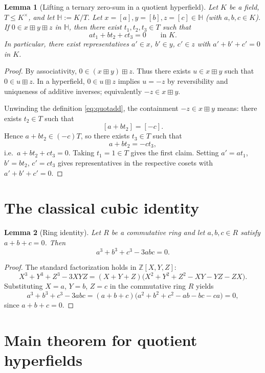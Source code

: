 \documentclass[11pt]{article}
\newtheorem{lemma}{Lemma}
\newcommand{\Hf}{\mathbb{H}}
\newcommand{\boxplusop}{\boxplus}
\begin{document}
\begin{lemma}[Lifting a ternary zero-sum in a quotient hyperfield]\label{lem:lift}
Let $K$ be a field, $T\le K^\times$, and let $\Hf:=K/T$.
Let $x=[a],y=[b],z=[c]\in \Hf$ (with $a,b,c\in K$).
If $0\in x\boxplusop y\boxplusop z$ in $\Hf$, then there exist $t_1,t_2,t_3\in T$ such that
\[
a t_1 + b t_2 + c t_3 = 0
\qquad\text{in }K.
\]
In particular, there exist representatives $a'\in x$, $b'\in y$, $c'\in z$ with $a'+b'+c'=0$ in $K$.
\end{lemma}

\begin{proof}
By associativity, $0\in (x\boxplusop y)\boxplusop z$.
Thus there exists $u\in x\boxplusop y$ such that $0\in u\boxplusop z$.
In a hyperfield, $0\in u\boxplusop z$ implies $u=-z$ by reversibility and uniqueness of additive inverses;
equivalently $-z\in x\boxplusop y$.

Unwinding the definition \eqref{eq:quotadd}, the containment $-z\in x\boxplusop y$ means:
there exists $t_2\in T$ such that
\[
[a+b t_2]=[-c].
\]
Hence $a+b t_2\in (-c)T$, so there exists $t_3\in T$ such that
\[
a + b t_2 = -c t_3,
\]
i.e.\ $a + b t_2 + c t_3=0$.
Taking $t_1=1\in T$ gives the first claim. Setting $a'=a t_1$, $b'=b t_2$, $c'=c t_3$
gives representatives in the respective cosets with $a'+b'+c'=0$.
\end{proof}

\section{The classical cubic identity}

\begin{lemma}[Ring identity]\label{lem:ring}
Let $R$ be a commutative ring and let $a,b,c\in R$ satisfy $a+b+c=0$.
Then
\[
a^3+b^3+c^3-3abc = 0.
\]
\end{lemma}

\begin{proof}
The standard factorization holds in $\mathbb{Z}[X,Y,Z]$:
\[
X^3+Y^3+Z^3-3XYZ = (X+Y+Z)\bigl(X^2+Y^2+Z^2-XY-YZ-ZX\bigr).
\]
Substituting $X=a$, $Y=b$, $Z=c$ in the commutative ring $R$ yields
\[
a^3+b^3+c^3-3abc = (a+b+c)\bigl(a^2+b^2+c^2-ab-bc-ca\bigr)=0,
\]
since $a+b+c=0$.
\end{proof}

\section{Main theorem for quotient hyperfields}
\end{document}
